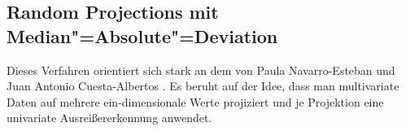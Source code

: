 \subsection{Random Projections mit Median"=Absolute"=Deviation}
Dieses Verfahren orientiert sich stark an dem von Paula Navarro-Esteban und Juan Antonio Cuesta-Albertos \cite{randomProjection}. Es beruht auf der Idee, dass man multivariate Daten auf mehrere ein-dimensionale Werte projiziert und je Projektion eine univariate Ausreißererkennung anwendet.